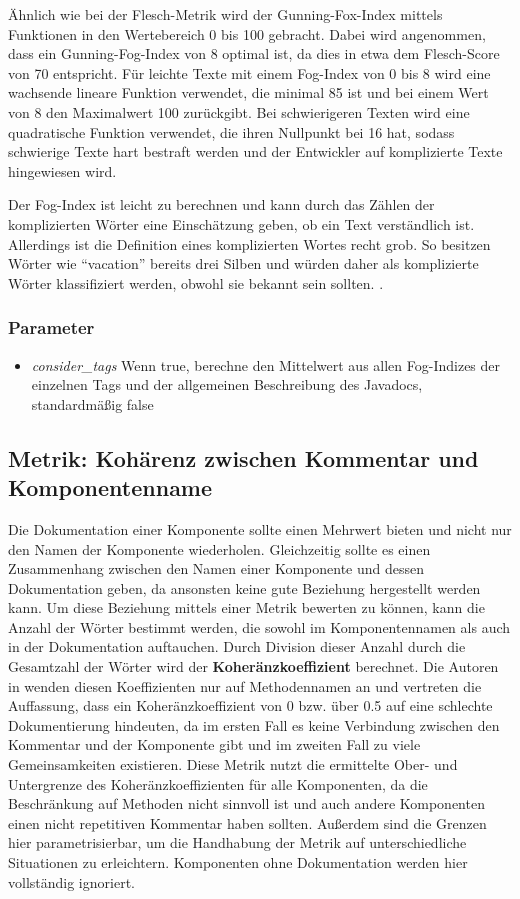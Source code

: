 Ähnlich wie bei der Flesch-Metrik wird der Gunning-Fox-Index mittels Funktionen in den Wertebereich 0 bis 100 gebracht. Dabei wird angenommen, dass ein Gunning-Fog-Index von 8 optimal ist, da dies in etwa dem Flesch-Score von 70 entspricht. Für leichte Texte mit einem Fog-Index von 0 bis 8 wird eine wachsende lineare Funktion verwendet, die minimal 85 ist und bei einem Wert von 8 den Maximalwert 100 zurückgibt. Bei schwierigeren Texten  wird eine quadratische Funktion verwendet, die ihren Nullpunkt bei 16 hat, sodass schwierige Texte hart bestraft werden und der Entwickler auf komplizierte Texte hingewiesen wird.

Der Fog-Index ist leicht zu berechnen und kann durch das Zählen der komplizierten Wörter eine Einschätzung geben, ob ein Text verständlich ist. Allerdings ist die Definition eines komplizierten Wortes recht grob. So besitzen Wörter wie \enquote{vacation} bereits drei Silben und würden daher als komplizierte Wörter klassifiziert werden, obwohl sie  bekannt sein sollten. \cite[S. 10]{bogert1985defense}.

\subsubsection{Parameter}
\begin{itemize}
    \item \textit{consider\_tags} Wenn true, berechne den Mittelwert aus allen Fog-Indizes der einzelnen Tags und der allgemeinen Beschreibung des Javadocs, standardmäßig false
\end{itemize}
\subsection{Metrik: Kohärenz zwischen Kommentar und Komponentenname}\label{chapter:metrics_coherence}
Die Dokumentation einer Komponente sollte einen Mehrwert bieten und nicht nur den Namen der Komponente wiederholen. Gleichzeitig sollte es einen Zusammenhang zwischen den Namen einer Komponente und dessen Dokumentation geben, da ansonsten keine gute Beziehung hergestellt werden kann\cite[S. 86-87]{Qualityanalysisofsourcecodecomments}. Um diese Beziehung mittels einer Metrik bewerten zu können, kann die Anzahl der Wörter bestimmt werden, die sowohl im Komponentennamen als auch in der Dokumentation auftauchen. Durch Division dieser Anzahl durch die Gesamtzahl der Wörter wird der \textbf{Koheränzkoeffizient} berechnet. Die Autoren in \cite[S. 86-87]{Qualityanalysisofsourcecodecomments} wenden diesen Koeffizienten nur auf Methodennamen an und vertreten die Auffassung, dass ein Koheränzkoeffizient von 0 bzw. über 0.5 auf eine schlechte Dokumentierung hindeuten, da im ersten Fall es keine Verbindung zwischen den Kommentar und der Komponente gibt und im zweiten Fall zu viele Gemeinsamkeiten existieren. Diese Metrik nutzt die ermittelte Ober- und Untergrenze des Koheränzkoeffizienten für alle Komponenten, da die Beschränkung auf Methoden nicht sinnvoll ist und auch andere Komponenten einen nicht repetitiven Kommentar haben sollten. Außerdem sind die Grenzen hier parametrisierbar, um die Handhabung der Metrik auf unterschiedliche Situationen zu erleichtern. Komponenten ohne Dokumentation werden hier vollständig ignoriert. 

